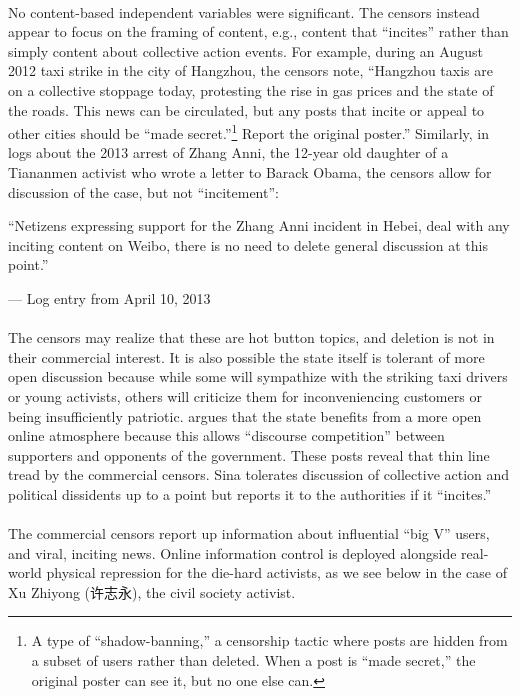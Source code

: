 \documentclass[12pt]{article}
\begin{document}
\begin{CJK*}{UTF8}{gbsn}
\paragraph{} No content-based independent variables were significant. The censors instead appear to focus on the framing of content, e.g., content that ``incites'' rather than  simply content about collective action events. For example, during an August 2012 taxi strike in the city of Hangzhou, the censors note, ``Hangzhou taxis are on a collective stoppage today, protesting the rise in gas prices and the state of the roads. This news can be circulated, but any posts that incite or appeal to other cities should be ``made secret.''\footnote{A type of ``shadow-banning,'' a censorship tactic where posts are hidden from a subset of users rather than deleted. When a post is ``made secret,'' the original poster can see it, but no one else can.} Report the original poster.'' Similarly, in logs about the 2013 arrest of Zhang Anni, the 12-year old daughter of a Tiananmen activist who wrote a letter to Barack Obama, the censors allow for discussion of the case, but not ``incitement'':

{
\epigraph{``Netizens expressing support for the Zhang Anni incident in Hebei, deal with any inciting content on Weibo, there is no need to delete general discussion at this point.''\footnotemark\newline}{--- Log entry from April 10, 2013}}

\paragraph{} The censors may realize that these are hot button topics, and deletion is not in their commercial interest. It is also possible the state itself is tolerant of more open discussion because while some will sympathize with the striking taxi drivers or young activists, others will criticize them for inconveniencing customers or being insufficiently patriotic. \cite{han2018contesting} argues that the state benefits from a more open online atmosphere because this allows ``discourse competition'' between supporters and opponents of the government. These posts reveal that thin line tread by the commercial censors. Sina tolerates discussion of collective action and political dissidents up to a point but reports it to the authorities if it ``incites.'' 
\paragraph{} The commercial censors report up information about influential ``big V'' users, and viral, inciting news. Online information control is deployed alongside real-world physical repression for the die-hard activists, as we see below in the case of Xu Zhiyong (许志永), the civil society activist.


\end{CJK*}
\end{document}
